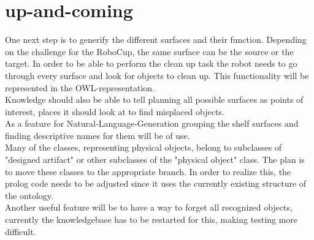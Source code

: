 \documentclass[main.tex]{subfiles}
\begin{document}
		\section{up-and-coming}
		One next step is to generify the different surfaces and their function. Depending on the challenge for the RoboCup, the same surface can be the source or the target. In order to be able to perform the clean up task the robot needs to go through every surface and look for objects to clean up. This functionality will be represented in the OWL-representation.\\
		Knowledge should also be able to tell planning all possible surfaces as points of interest, places it should look at to find misplaced objects.\\
		As a feature for Natural-Language-Generation grouping the shelf surfaces and finding descriptive names for them will be of use.\\
		Many of the classes, representing physical objects, belong to subclasses of "designed artifact" or other subclasses of the "physical object" class. The plan is to move these classes to the appropriate branch. In order to realize this, the prolog code needs to be adjusted since it uses the currently existing structure of the ontology.\\
		Another useful feature will be to have a way to forget all recognized objects, currently the knowledgebase has to be restarted for this, making testing more difficult. 
\end{document}
